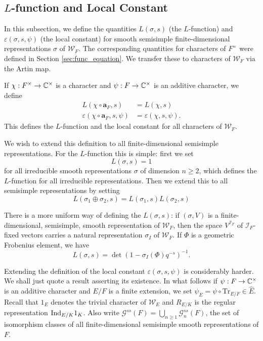 \subsection{\texorpdfstring{$L$}{TEXT}-function and Local Constant}
In this subsection, we define the quantities $L(\sigma, s)$ (the $L$-function) and $\varepsilon(\sigma, s, \psi)$ (the local constant) for smooth semisimple finite-dimensional representations $\sigma$ of $\mathcal{W}_F$. The corresponding quantities for characters of $F^\times$ were defined in Section \ref{sec:func_equation}. We transfer these to characters of $\mathcal{W}_F$ via the Artin map.
\begin{defn}\label{defn:LfuncWeil}
	If $\chi: F^\times \to \mathbb{C}^\times$ is a character and $\psi: F\to \mathbb{C}^\times$ is an additive character, we define
	\begin{align*}
		L(\chi\circ\mathbf{a}_F, s) &= L(\chi, s)\\
		\varepsilon(\chi\circ\mathbf{a}_F, s, \psi) &= \varepsilon(\chi, s, \psi).
	\end{align*}
	This defines the $L$-function and the local constant for all characters of $\mathcal{W}_F$.
\end{defn}
We wish to extend this definition to all finite-dimensional semisimple representations. For the $L$-function this is simple: first we set
\[L(\sigma, s) = 1\]
for all irreducible smooth representations $\sigma$ of dimension $n\ge 2$, which defines the $L$-function for all irreducible representations. Then we extend this to all semisimple representations by setting
\[L(\sigma_1\oplus \sigma_2, s) = L(\sigma_1, s)L(\sigma_2, s)\]
\begin{rem}
	There is a more uniform way of defining the $L(\sigma, s)$: if $(\sigma, V)$ is a finite-dimensional, semisimple, smooth representation of $\mathcal{W}_F$, then the space $V^{\mathcal{I}_F}$ of $\mathcal{I}_F$-fixed vectors carries a natural representation $\sigma_{I}$ of $\mathcal{W}_F$. If $\Phi$ is a geometric Frobenius element, we have
	\[L(\sigma, s) = \det(1 - \sigma_I(\Phi)q^{-s})^{-1}.\] 
\end{rem}
Extending the definition of the local constant $\varepsilon(\sigma, s, \psi)$ is considerably harder. We shall just quote a result asserting its existence. In what follows if $\psi: F\to \mathbb{C}^\times$ is an additive character and $E/F$ is a finite extension, we set $\psi_E = \psi \circ \mathrm{Tr}_{E/F}\in \widehat{E}$. Recall that $1_E$ denotes the trivial character of $\mathcal{W}_E$ and $R_{E/K}$ is the regular representation $\mathrm{Ind}_{E/K} 1_K$. Also write $\mathcal{G}^{ss}(F) = \bigcup_{n\ge 1} \mathcal{G}^{ss}_n(F)$, the set of isomorphism classes of all finite-dimensional semisimple smooth representations of $F$.
